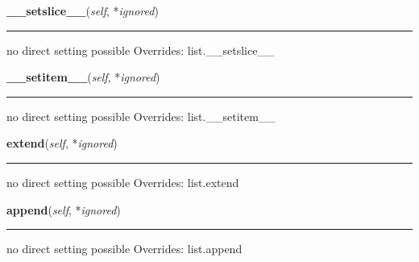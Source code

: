     \vspace{0.5ex}

\hspace{.8\funcindent}\begin{boxedminipage}{\funcwidth}

    \raggedright \textbf{\_\_setslice\_\_}(\textit{self}, *\textit{ignored})

    \vspace{-1.5ex}

    \rule{\textwidth}{0.5\fboxrule}
\setlength{\parskip}{2ex}

no direct setting possible
\setlength{\parskip}{1ex}
      Overrides: list.\_\_setslice\_\_

    \end{boxedminipage}

    \vspace{0.5ex}

\hspace{.8\funcindent}\begin{boxedminipage}{\funcwidth}

    \raggedright \textbf{\_\_setitem\_\_}(\textit{self}, *\textit{ignored})

    \vspace{-1.5ex}

    \rule{\textwidth}{0.5\fboxrule}
\setlength{\parskip}{2ex}

no direct setting possible
\setlength{\parskip}{1ex}
      Overrides: list.\_\_setitem\_\_

    \end{boxedminipage}

    \vspace{0.5ex}

\hspace{.8\funcindent}\begin{boxedminipage}{\funcwidth}

    \raggedright \textbf{extend}(\textit{self}, *\textit{ignored})

    \vspace{-1.5ex}

    \rule{\textwidth}{0.5\fboxrule}
\setlength{\parskip}{2ex}

no direct setting possible
\setlength{\parskip}{1ex}
      Overrides: list.extend

    \end{boxedminipage}

    \vspace{0.5ex}

\hspace{.8\funcindent}\begin{boxedminipage}{\funcwidth}

    \raggedright \textbf{append}(\textit{self}, *\textit{ignored})

    \vspace{-1.5ex}

    \rule{\textwidth}{0.5\fboxrule}
\setlength{\parskip}{2ex}

no direct setting possible
\setlength{\parskip}{1ex}
      Overrides: list.append

    \end{boxedminipage}

